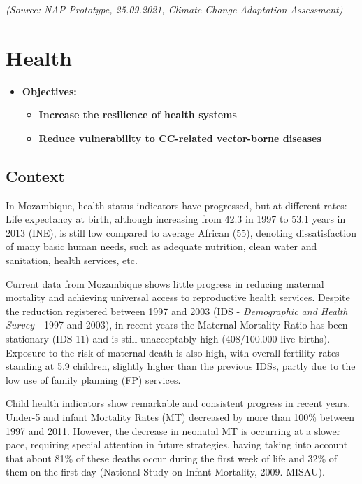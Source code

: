 \documentclass[
]{book}
\providecommand{\tightlist}{%
  \setlength{\itemsep}{0pt}\setlength{\parskip}{0pt}}
\begin{document}
\emph{(Source: NAP Prototype, 25.09.2021, Climate Change Adaptation Assessment)}

\hypertarget{health}{%
\section{Health}\label{health}}

\begin{itemize}
\tightlist
\item
  \textbf{Objectives:}

  \begin{itemize}
  \tightlist
  \item
    \textbf{Increase the resilience of health systems}
  \item
    \textbf{Reduce vulnerability to CC-related vector-borne diseases}
  \end{itemize}
\end{itemize}

\hypertarget{context-4}{%
\subsection{Context}\label{context-4}}

In Mozambique, health status indicators have progressed, but at different rates: Life expectancy at birth, although increasing from 42.3 in 1997 to 53.1 years in 2013 (INE), is still low compared to average African (55), denoting dissatisfaction of many basic human needs, such as adequate nutrition, clean water and sanitation, health services, etc.

Current data from Mozambique shows little progress in reducing maternal mortality and achieving universal access to reproductive health services. Despite the reduction registered between 1997 and 2003 (IDS - \emph{Demographic and Health Survey} - 1997 and 2003), in recent years the Maternal Mortality Ratio has been stationary (IDS 11) and is still unacceptably high (408/100.000 live births). Exposure to the risk of maternal death is also high, with overall fertility rates standing at 5.9 children, slightly higher than the previous IDSs, partly due to the low use of family planning (FP) services.

Child health indicators show remarkable and consistent progress in recent years. Under-5 and infant Mortality Rates (MT) decreased by more than 100\% between 1997 and 2011. However, the decrease in neonatal MT is occurring at a slower pace, requiring special attention in future strategies, having taking into account that about 81\% of these deaths occur during the first week of life and 32\% of them on the first day (National Study on Infant Mortality, 2009. MISAU).
\end{document}
